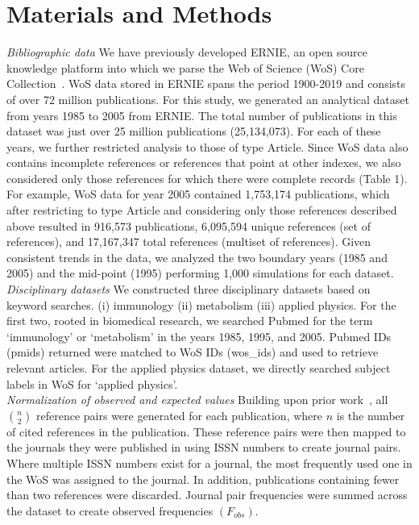 \documentclass[NETN]{stjour}
\begin{document}
\section{Materials and Methods}
\emph{Bibliographic data} We have previously developed ERNIE, an open source knowledge platform into which we parse the Web of Science (WoS) Core Collection~\citep{Keserci371955}. WoS data stored in ERNIE spans the period 1900-2019 and consists of over 72 million publications. For this study, we generated an analytical dataset from years 1985 to 2005 from ERNIE. The total number of publications in this dataset was just over 25 million publications (25,134,073).  For each of these years, we further restricted analysis to those of type Article. Since WoS data also contains incomplete references or references that point at other indexes,  we also considered only those references for which there were complete records (Table 1). For example, WoS data for year 2005 contained 1,753,174 publications, which after restricting to type Article and considering only those references described above resulted in 916,573 publications, 6,095,594 unique references (set of references), and 17,167,347 total references (multiset of references). Given consistent trends in the data, we analyzed the two boundary years (1985 and 2005) and the mid-point (1995) performing 1,000 simulations for each dataset. \\
\emph{Disciplinary datasets} We constructed three disciplinary datasets based on keyword searches. (i) immunology (ii) metabolism (iii) applied physics. For the first two, rooted in biomedical research, we searched Pubmed for the term `immunology' or `metabolism' in the years 1985, 1995, and 2005. Pubmed IDs (pmids) returned were matched to WoS IDs (wos\_ids) and used to retrieve relevant articles. For the applied physics dataset, we directly searched subject labels in WoS for `applied physics'. \\
\emph{Normalization of observed and expected values} Building upon prior work~\cite{uzzi_atypical_2013}, all ${n \choose 2}$ reference pairs were generated for each publication, where $n$ is the number of cited references in the publication. These reference pairs were then mapped to the journals they were published in using ISSN numbers to create journal pairs. Where multiple ISSN numbers exist for a journal, the most frequently used one in the WoS was assigned to the journal. In addition, publications containing fewer than two references were discarded. Journal pair frequencies were summed across the dataset to create observed frequencies $(F_{obs})$. 
\end{document}

